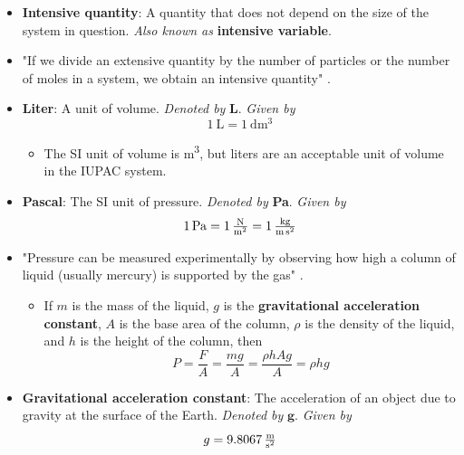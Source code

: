 \documentclass[../notes.tex]{subfiles}
\begin{document}
\begin{itemize}
    \item \textbf{Intensive quantity}: A quantity that does not depend on the size of the system in question. \emph{Also known as} \textbf{intensive variable}.
    \item "If we divide an extensive quantity by the number of particles or the number of moles in a system, we obtain an intensive quantity" \parencite[638]{bib:McQuarrieSimon}.
    \item \textbf{Liter}: A unit of volume. \emph{Denoted by} \textbf{L}. \emph{Given by}
    \begin{equation*}
        \SI{1}{\liter} = \SI{1}{\deci\meter\cubed}
    \end{equation*}
    \begin{itemize}
        \item The SI unit of volume is \si{\cubic\meter}, but liters are an acceptable unit of volume in the IUPAC system.
    \end{itemize}
    \item \textbf{Pascal}: The SI unit of pressure. \emph{Denoted by} \textbf{Pa}. \emph{Given by}
    \begin{equation*}
        \SI{1}{\pascal} = \SI[per-mode=fraction,fraction-function=\tfrac]{1}{\newton\per\meter\squared}
        = \SI[per-mode=fraction,fraction-function=\tfrac]{1}{\kilo\gram\per\meter\per\second\squared}
    \end{equation*}
    \item "Pressure can be measured experimentally by observing how high a column of liquid (usually mercury) is supported by the gas" \parencite[638]{bib:McQuarrieSimon}.
    \begin{itemize}
        \item If $m$ is the mass of the liquid, $g$ is the \textbf{gravitational acceleration constant}, $A$ is the base area of the column, $\rho$ is the density of the liquid, and $h$ is the height of the column, then
        \begin{equation*}
            P = \frac{F}{A} = \frac{mg}{A} = \frac{\rho hAg}{A} = \rho hg
        \end{equation*}
    \end{itemize}
    \item \textbf{Gravitational acceleration constant}: The acceleration of an object due to gravity at the surface of the Earth. \emph{Denoted by} $\bm{g}$. \emph{Given by}
    \begin{equation*}
        g = \SI[per-mode=fraction,fraction-function=\tfrac]{9.8067}{\meter\per\second\squared}

\end{equation*}
\end{itemize}
\end{document}
